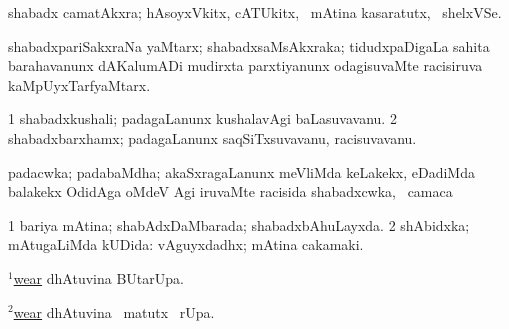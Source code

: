 \bentry
{} 
\gl{\nA}
\expl{}
\bmng
shabadx camatAkxra; hAsoyxVkitx, cATUkitx, \mo\ mAtina kasaratutx, \kanmu\ shelxVSe. 
\emng
\eentry

\bentry
{} 
\gl{\nA}
\expl{}
\bmng
shabadxpariSakxraNa yaMtarx; shabadxsaMsAkxraka; tidudxpaDigaLa sahita barahavanunx dAKalumADi mudirxta parxtiyanunx odagisuvaMte racisiruva kaMpUyxTarfyaMtarx. 
\emng
\eentry

\bentry
{} 
\gl{\nA}
\expl{}
\bmng
\bnum
\num{1} shabadxkushali; padagaLanunx kushalavAgi baLasuvavanu. 
\num{2} shabadxbarxhamx; padagaLanunx saqSiTxsuvavanu, racisuvavanu. 
\enum
\emng
\eentry

\bentry
{} 
\gl{\nA}
\bmng
padacwka; padabaMdha; akaSxragaLanunx meVliMda keLakekx, eDadiMda balakekx OdidAga oMdeV Agi iruvaMte racisida shabadxcwka, \udA\ camaca  
\emng
\eentry

\bentry
{} 
\gl{\gu}
\bmng
\bnum
\num{1} bariya mAtina; shabAdxDaMbarada; shabadxbAhuLayxda. 
\num{2} shAbidxka; mAtugaLiMda kUDida:  vAguyxdadhx; mAtina cakamaki. 
\enum
\emng
\eentry

\bentry
{} 
\gl{\kirx}
\expl{}
\bmng
\hyperlink{wear(1)}{$^1$wear} dhAtuvina BUtarUpa. 
\emng
\eentry

\bentry
{} 
\gl{\kirx}
\expl{}
\bmng
\hyperlink{wear(2)}{$^2$wear} dhAtuvina \BU\ matutx \BUkaq\ rUpa. 
\emng
\eentry

